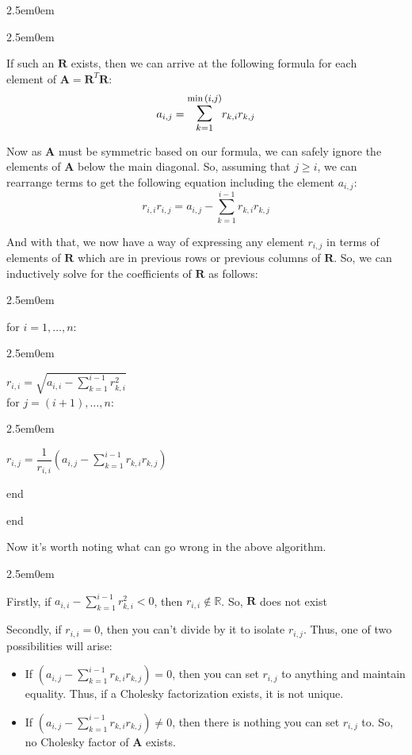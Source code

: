 \documentclass{book}
\newcommand{\hThree}{%
   \color{PineGreen}
   \fontsize{13}{15}\selectfont%
}
\newcommand{\hFour}{%
   \color{Cerulean}
   \fontsize{12}{14}\selectfont%
}
\newenvironment{myIndent}{%
   \begin{adjustwidth}{2.5em}{0em}%
}{%
   \end{adjustwidth}%
}
\newcommand{\retTwo}{\hfill\bigbreak}
\newcommand{\mMat}[1]{\mathbf{#1}}
\begin{document}
{\begin{myIndent}
\begin{myIndent}
         \hThree
         If such an $\mMat{R}$ exists, then we can arrive at the following formula for each\\ element of $\mMat{A} = \mMat{R}^T\mMat{R}$:
            \[a_{i,j}=\mathlarger{\mathlarger{\sum}}_{k=1}^{\min{(i,j)}}{r_{k,i}r_{k,j}}\]

         Now as $\mMat{A}$ must be symmetric based on our formula, we can safely ignore the elements of $\mMat{A}$ below the main diagonal. So, assuming that $j \geq i$, we can rearrange terms to get the following equation including the element $a_{i,j}$:
         \[r_{i,i}r_{i,j} = a_{i,j} - \sum_{k=1}^{i-1}{r_{k,i}r_{k,j}}\]

         \newpage
         
         And with that, we now have a way of expressing any element $r_{i,j}$ in terms of \\elements of $\mMat{R}$ which are in previous rows or previous columns of $\mMat{R}$. So, we can inductively solve for the coefficients of $\mMat{R}$ as follows: \retTwo
         {\begin{myIndent} \hFour
            for $i = 1, \ldots, n$:\\
            \begin{myIndent}
               $r_{i,i} = \sqrt{a_{i,i} - {\displaystyle\sum_{k=1}^{i-1}{r_{k,i}^2}}}$\\

               for $j = (i+1), \ldots, n$:\\
               \begin{myIndent}
               $r_{i,j} = \dfrac{1}{r_{i,i}}\left(a_{i,j} - {\displaystyle\sum_{k=1}^{i-1}{r_{k,i}r_{k,j}}}\right)$
               \end{myIndent}
               end
            \end{myIndent}
            end \\
         \end{myIndent}}

         Now it's worth noting what can go wrong in the above algorithm. 
         \begin{myIndent}
            Firstly, if $a_{i,i} - {\displaystyle\sum_{k=1}^{i-1}{r_{k,i}^2}} < 0$, then $r_{i,i} \notin \mathbb{R}$. So, $\mMat{R}$ does not exist \retTwo
            
            Secondly, if $r_{i,i} = 0$, then you can't divide by it to isolate $r_{i,j}$. Thus, one of two possibilities will arise:
            \begin{itemize}
               \item If $\left(a_{i,j} - {\displaystyle\sum_{k=1}^{i-1}{r_{k,i}r_{k,j}}}\right) = 0$, then you can set $r_{i,j}$ to anything and maintain equality. Thus, if a Cholesky factorization exists, it is not unique. \\
               \item If $\left(a_{i,j} - {\displaystyle\sum_{k=1}^{i-1}{r_{k,i}r_{k,j}}}\right) \neq 0$, then there is nothing you can set $r_{i,j}$ to. So, no Cholesky factor of $\mMat{A}$ exists.
            \end{itemize}
         \end{myIndent}\retTwo
      

\end{myIndent}
\end{myIndent}}
\end{document}
